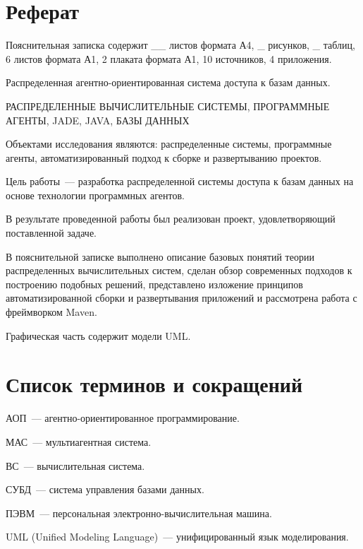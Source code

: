 \updateStamp
{}
\section*{Реферат}
Пояснительная записка содержит \_\_ листов формата А4, \_ рисунков, \_ таблиц, 6 листов формата А1, 2 плаката формата А1, 10 источников, 4 приложения.

Распределенная агентно-ориентированная система доступа к базам данных.

РАСПРЕДЕЛЕННЫЕ ВЫЧИСЛИТЕЛЬНЫЕ СИСТЕМЫ, ПРОГРАММНЫЕ АГЕНТЫ, JADE, JAVA, БАЗЫ ДАННЫХ

Объектами исследования являются: распределенные системы, программные агенты, автоматизированный подход к сборке и развертыванию проектов.

Цель работы~--- разработка распределенной системы доступа к базам данных на основе технологии программных агентов.

В результате проведенной работы был реализован проект, удовлетворяющий поставленной задаче.

В пояснительной записке выполнено описание базовых понятий теории распределенных вычислительных систем, сделан обзор современных подходов к построению подобных решений,  представлено изложение принципов  автоматизированной сборки и развертывания приложений и рассмотрена работа с фреймворком Maven.

Графическая часть содержит модели UML.

\newpage
\section*{Список терминов и сокращений}
АОП~--- агентно-ориентированное программирование.

МАС~--- мультиагентная система.
 
ВС~--- вычислительная система.

СУБД~--- система управления базами данных.

ПЭВМ~--- персональная электронно-вычислительная машина.

UML (Unified Modeling Language)~--- унифицированный язык моделирования.
